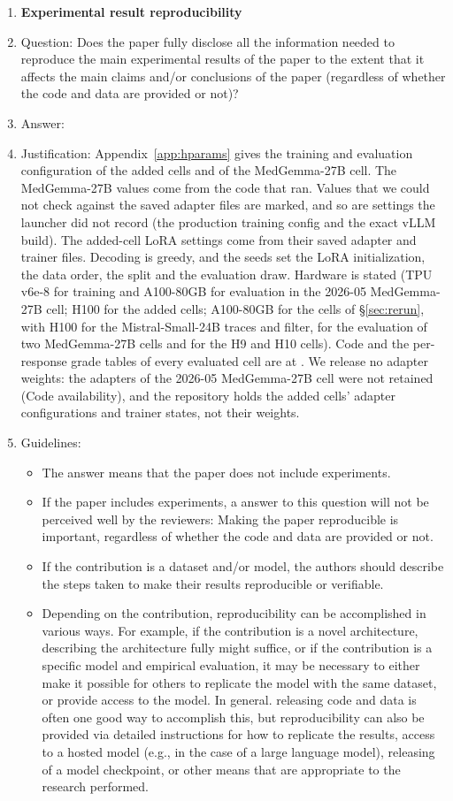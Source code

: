 \begin{enumerate}
    \item {\bf Experimental result reproducibility}
    \item[] Question: Does the paper fully disclose all the information needed to reproduce the main experimental results of the paper to the extent that it affects the main claims and/or conclusions of the paper (regardless of whether the code and data are provided or not)?
    \item[] Answer: \answerYes{}
    \item[] Justification: Appendix~\ref{app:hparams} gives the training and evaluation configuration of the added cells and of the MedGemma-27B cell. The MedGemma-27B values come from the code that ran. Values that we could not check against the saved adapter files are marked, and so are settings the launcher did not record (the production training config and the exact vLLM build). The added-cell LoRA settings come from their saved adapter and trainer files. Decoding is greedy, and the seeds set the LoRA initialization, the data order, the split and the evaluation draw. Hardware is stated (TPU v6e-8 for training and A100-80GB for evaluation in the 2026-05 MedGemma-27B cell; H100 for the added cells; A100-80GB for the cells of \S\ref{sec:rerun}, with H100 for the Mistral-Small-24B traces and filter, for the evaluation of two MedGemma-27B cells and for the H9 and H10 cells). Code and the per-response grade tables of every evaluated cell are at \codeurl{}. We release no adapter weights: the adapters of the 2026-05 MedGemma-27B cell were not retained (Code availability), and the repository holds the added cells' adapter configurations and trainer states, not their weights.
    \item[] Guidelines:
    \begin{itemize}
        \item The answer \answerNA{} means that the paper does not include experiments.
        \item If the paper includes experiments, a \answerNo{} answer to this question will not be perceived well by the reviewers: Making the paper reproducible is important, regardless of whether the code and data are provided or not.
        \item If the contribution is a dataset and\slash or model, the authors should describe the steps taken to make their results reproducible or verifiable.
        \item Depending on the contribution, reproducibility can be accomplished in various ways. For example, if the contribution is a novel architecture, describing the architecture fully might suffice, or if the contribution is a specific model and empirical evaluation, it may be necessary to either make it possible for others to replicate the model with the same dataset, or provide access to the model. In general. releasing code and data is often one good way to accomplish this, but reproducibility can also be provided via detailed instructions for how to replicate the results, access to a hosted model (e.g., in the case of a large language model), releasing of a model checkpoint, or other means that are appropriate to the research performed.

\end{itemize}
\end{enumerate}
